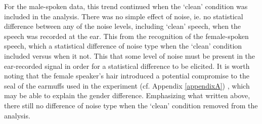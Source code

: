 For the male-spoken data, this trend continued when the `clean' condition was included in the analysis.  There was no simple effect of noise, ie. no statistical difference between any of the noise levels, including `clean' speech, when the speech was recorded at the ear.  This \DIFdelbegin {}\DIFdelend \DIFaddbegin {}\DIFaddend from the recognition of the female-spoken speech, which \DIFdelbegin {}\DIFdelend \DIFaddbegin {}\DIFaddend a statistical difference of noise type when the `clean' condition \DIFdelbegin {}\DIFdelend \DIFaddbegin {}\DIFaddend included versus when it \DIFdelbegin {}\DIFdelend \DIFaddbegin {}\DIFaddend not.  This \DIFdelbegin {}\DIFdelend \DIFaddbegin {}\DIFaddend that some level of noise must be present in the ear-recorded signal in order for a statistical difference to be elicited.  It is worth noting that the female speaker's hair introduced a potential compromise to the seal of the earmuffs used in the experiment (cf. Appendix \ref{appendixA}) \DIFaddbegin {}\DIFaddend , which may be able to explain the gender difference. Emphasizing what \DIFdelbegin {}\DIFdelend \DIFaddbegin {}\DIFaddend written above, there \DIFdelbegin {}\DIFdelend \DIFaddbegin {}\DIFaddend still no difference of noise type when the `clean' condition \DIFdelbegin {}\DIFdelend \DIFaddbegin {}\DIFaddend removed from the analysis.  \DIFaddbegin {}\DIFaddend 

